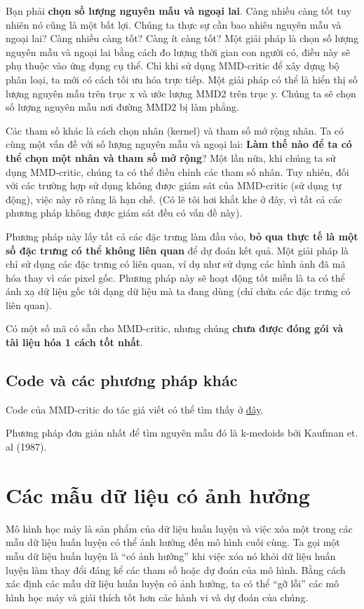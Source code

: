 Bạn phải \textbf{chọn số lượng nguyên mẫu và ngoại lai}. Càng nhiều càng tốt tuy nhiên nó cũng là một bất lợi. Chúng ta thực sự cần bao nhiêu nguyên mẫu và ngoại lai? Càng nhiều càng tốt? Càng ít càng tốt? Một giải pháp là chọn số lượng nguyên mẫu và ngoại lai bằng cách đo lượng thời gian con người có, điều này sẽ phụ thuộc vào ứng dụng cụ thể. Chỉ khi sử dụng MMD-critic để xây dựng bộ phân loại, ta mới có cách tối ưu hóa trực tiếp. Một giải pháp có thể là hiển thị số lượng nguyên mẫu trên trục x và ước lượng MMD2 trên trục y. Chúng ta sẽ chọn số lượng nguyên mẫu nơi đường MMD2 bị làm phẳng.

Các tham số khác là cách chọn nhân (kernel) và tham số mở rộng nhân. Ta có cùng một vấn đề với số lượng nguyên mẫu và ngoại lai: \textbf{Làm thế nào để ta có thể chọn một nhân và tham số mở rộng}? Một lần nữa, khi chúng ta sử dụng MMD-critic, chúng ta có thể điều chỉnh các tham số nhân. Tuy nhiên, đối với các trường hợp sử dụng không được giám sát của MMD-critic (sử dụng tự động), việc này rõ ràng là hạn chế. (Có lẽ tôi hơi khắt khe ở đây, vì tất cả các phương pháp không được giám sát đều có vấn đề này).

Phương pháp này lấy tất cả các đặc trưng làm đầu vào, \textbf{bỏ qua thực tế là một số đặc trưng có thể không liên quan} để dự đoán kết quả. Một giải pháp là chỉ sử dụng các đặc trưng có liên quan, ví dụ như sử dụng các hình ảnh đã mã hóa thay vì các pixel gốc. Phương pháp này sẽ hoạt động tốt miễn là ta có thể ánh xạ dữ liệu gốc tới dạng dữ liệu mà ta đang dùng (chỉ chứa các đặc trưng có liên quan).

Có một số mã có sẵn cho MMD-critic, nhưng chúng \textbf{chưa được đóng gói và tài liệu hóa 1 cách tốt nhất}.

\subsection{Code và các phương pháp khác}
Code của MMD-critic do tác giả viết có thể tìm thấy ở \href{https://github.com/BeenKim/MMD-critic}{đây}.

Phương pháp đơn giản nhất để tìm nguyên mẫu đó là k-medoids bởi Kaufman et. al (1987).
\clearpage

\section{Các mẫu dữ liệu có ảnh hưởng}

Mô hình học máy là sản phẩm của dữ liệu huấn luyện và việc xóa một trong các mẫu dữ liệu huấn luyện có thể ảnh hưởng đến mô hình cuối cùng. Ta gọi một mẫu dữ liệu huấn luyện là ``có ảnh hưởng'' khi việc xóa nó khỏi dữ liệu huấn luyện làm thay đổi đáng kể các tham số hoặc dự đoán của mô hình. Bằng cách xác định các mẫu dữ liệu huấn luyện có ảnh hưởng, ta có thể ``gỡ lỗi'' các mô hình học máy và giải thích tốt hơn các hành vi và dự đoán của chúng.

